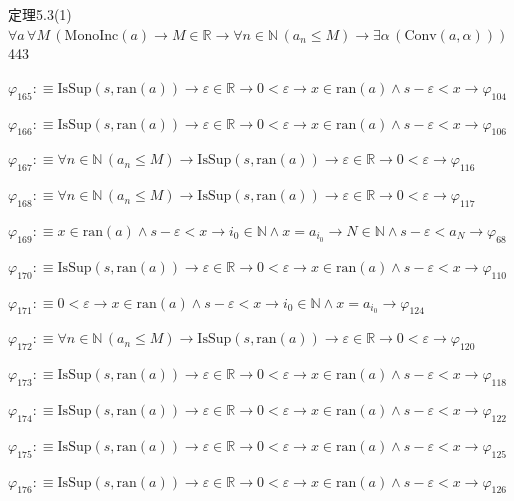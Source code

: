 \begin{fullproof}{定理5.3(1)}{$\forall a\,\forall M\,(\mathrm{MonoInc}(a) \to M \in \mathbb{R} \to \forall n \in \mathbb{N}\,(a_{n} \leq M) \to \exists \alpha\,(\mathrm{Conv}(a,\alpha)))$}{443}
\begin{abbrevlist}
\item $\varphi_{165} :\equiv \mathrm{IsSup}(s,\mathrm{ran}(a)) \to \varepsilon \in \mathbb{R} \to 0 < \varepsilon \to x \in \mathrm{ran}(a) \land s - \varepsilon < x \to \varphi_{104}$
\item $\varphi_{166} :\equiv \mathrm{IsSup}(s,\mathrm{ran}(a)) \to \varepsilon \in \mathbb{R} \to 0 < \varepsilon \to x \in \mathrm{ran}(a) \land s - \varepsilon < x \to \varphi_{106}$
\item $\varphi_{167} :\equiv \forall n \in \mathbb{N}\,(a_{n} \leq M) \to \mathrm{IsSup}(s,\mathrm{ran}(a)) \to \varepsilon \in \mathbb{R} \to 0 < \varepsilon \to \varphi_{116}$
\item $\varphi_{168} :\equiv \forall n \in \mathbb{N}\,(a_{n} \leq M) \to \mathrm{IsSup}(s,\mathrm{ran}(a)) \to \varepsilon \in \mathbb{R} \to 0 < \varepsilon \to \varphi_{117}$
\item $\varphi_{169} :\equiv x \in \mathrm{ran}(a) \land s - \varepsilon < x \to i_{0} \in \mathbb{N} \land x = a_{i_{0}} \to N \in \mathbb{N} \land s - \varepsilon < a_{N} \to \varphi_{68}$
\item $\varphi_{170} :\equiv \mathrm{IsSup}(s,\mathrm{ran}(a)) \to \varepsilon \in \mathbb{R} \to 0 < \varepsilon \to x \in \mathrm{ran}(a) \land s - \varepsilon < x \to \varphi_{110}$
\item $\varphi_{171} :\equiv 0 < \varepsilon \to x \in \mathrm{ran}(a) \land s - \varepsilon < x \to i_{0} \in \mathbb{N} \land x = a_{i_{0}} \to \varphi_{124}$
\item $\varphi_{172} :\equiv \forall n \in \mathbb{N}\,(a_{n} \leq M) \to \mathrm{IsSup}(s,\mathrm{ran}(a)) \to \varepsilon \in \mathbb{R} \to 0 < \varepsilon \to \varphi_{120}$
\item $\varphi_{173} :\equiv \mathrm{IsSup}(s,\mathrm{ran}(a)) \to \varepsilon \in \mathbb{R} \to 0 < \varepsilon \to x \in \mathrm{ran}(a) \land s - \varepsilon < x \to \varphi_{118}$
\item $\varphi_{174} :\equiv \mathrm{IsSup}(s,\mathrm{ran}(a)) \to \varepsilon \in \mathbb{R} \to 0 < \varepsilon \to x \in \mathrm{ran}(a) \land s - \varepsilon < x \to \varphi_{122}$
\item $\varphi_{175} :\equiv \mathrm{IsSup}(s,\mathrm{ran}(a)) \to \varepsilon \in \mathbb{R} \to 0 < \varepsilon \to x \in \mathrm{ran}(a) \land s - \varepsilon < x \to \varphi_{125}$
\item $\varphi_{176} :\equiv \mathrm{IsSup}(s,\mathrm{ran}(a)) \to \varepsilon \in \mathbb{R} \to 0 < \varepsilon \to x \in \mathrm{ran}(a) \land s - \varepsilon < x \to \varphi_{126}$

\end{abbrevlist}
\end{fullproof}
